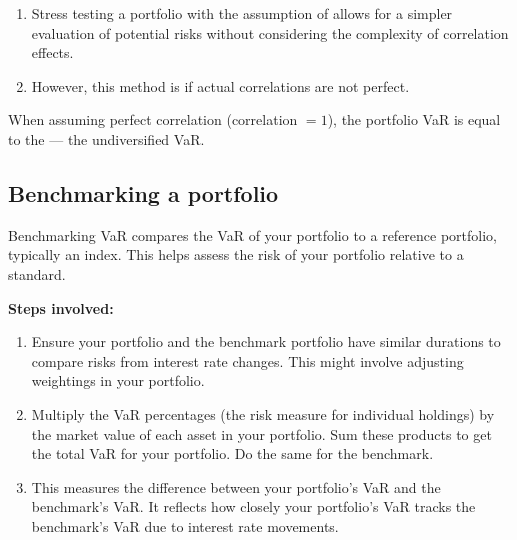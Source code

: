 
\begin{enumerate}[label=\textbf{\alph*)}]
\item Stress testing a portfolio with the assumption of  allows for a
      simpler evaluation of potential risks without considering the complexity of correlation
      effects.
\item However, this method is  if actual correlations are not perfect.
\end{enumerate}

\begin{mrkeybox}[title={Just remember}]
When assuming perfect correlation (correlation $= 1$), the portfolio VaR is equal to the
 --- the undiversified VaR.
\end{mrkeybox}


\subsection{Benchmarking a portfolio}
Benchmarking VaR compares the VaR of your portfolio to a reference portfolio, typically an
index. This helps assess the risk of your portfolio relative to a standard.

\textbf{Steps involved:}
\begin{enumerate}
\item {} Ensure your portfolio and the benchmark portfolio have similar
      durations to compare risks from interest rate changes. This might involve adjusting
      weightings in your portfolio.
\item {} Multiply the VaR percentages (the risk measure for
      individual holdings) by the market value of each asset in your portfolio. Sum these
      products to get the total VaR for your portfolio. Do the same for the benchmark.
\item {} This measures the difference between your portfolio's
      VaR and the benchmark's VaR. It reflects how closely your portfolio's VaR tracks the
      benchmark's VaR due to interest rate movements.
\end{enumerate}

